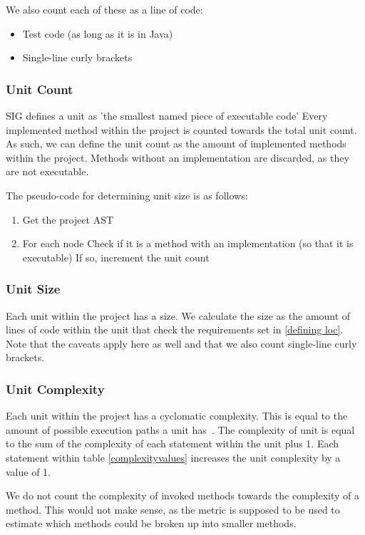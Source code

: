 \documentclass{article}
\begin{document}
We also count each of these as a line of code:
\begin{itemize}
\item Test code (as long as it is in Java)
\item Single-line curly brackets
\end{itemize}

\subsubsection{Unit Count}
SIG defines a unit as 'the smallest named piece of executable code'
Every implemented method within the project is counted towards the total unit count. As such, we can define the unit count as the amount of implemented methods within the project. Methods without an implementation are discarded, as they are not executable.

The pseudo-code for determining unit size is as follows:
\begin{enumerate}
\item Get the project AST
\item For each node
\subitem Check if it is a method with an implementation (so that it is executable)
\subitem If so, increment the unit count
\end{enumerate}

\subsubsection{Unit Size}
Each unit within the project has a size. We calculate the size as the amount of lines of code within the unit that check the requirements set in \ref{defining loc}. Note that the caveats apply here as well and that we also count single-line curly brackets.

\subsubsection{Unit Complexity}
Each unit within the project has a cyclomatic complexity. This is equal to the amount of possible execution paths a unit has~\cite{McCabe}. 
The complexity of unit is equal to the sum of the complexity of each statement within the unit plus 1. 
Each statement within table \ref{complexityvalues} increases the unit complexity by a value of 1.

We do not count the complexity of invoked methods towards the complexity of a method. This would not make sense, as the metric is supposed to be used to estimate which methods could be broken up into smaller methods.
\end{document}
